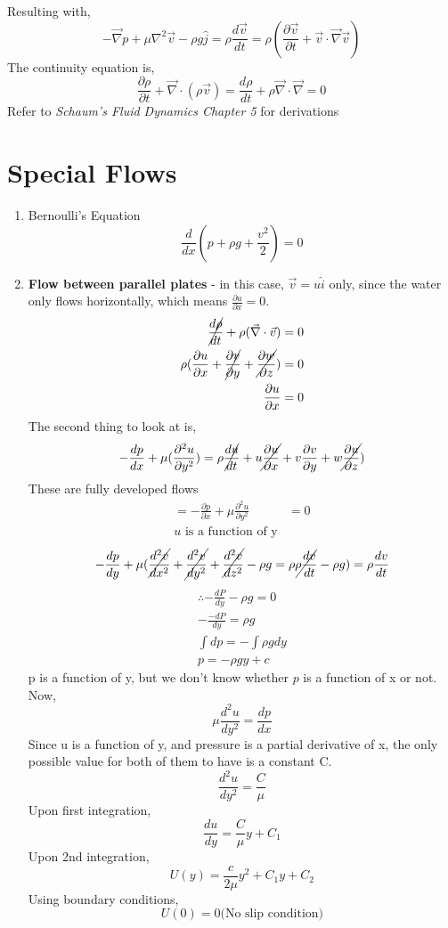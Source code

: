 \documentclass{report}
\begin{document}
Resulting with, 
\[
  - \vec{\nabla}p + \mu \nabla^2\vec{v} - \rho g \hat{j} = \rho \frac{d \vec{v}}{dt} = \rho (\frac{\partial \vec{v}}{\partial t} + \vec{v} \cdot \vec{\nabla} \vec{v})
\]
The continuity equation is,
\[
  \frac{\partial \rho}{\partial t} + \vec{\nabla} \cdot (\rho \vec{v}) = \frac{d \rho}{dt} + \rho \vec{\nabla} \cdot \vec{\nabla} = 0
\]
Refer to \textit{Schaum's Fluid Dynamics Chapter 5} for derivations
\section{Special Flows}
\begin{enumerate}
  \item Bernoulli's Equation \[
   \frac{d}{dx}(p + \rho g + \frac{v^2}{2})  = 0
  \]
\item \textbf{Flow between parallel plates} - in this case, $\vec{v} = u \hat{i}$ only, since the water only flows horizontally, which means $\frac{\partial u}{\partial x} = 0$. 
  \begin{align*}
    \cancel{\frac{d \rho}{d t}} + \rho (\vec{\nabla} \cdot \vec{v}) = 0 \\ 
    \rho(\frac{\partial u}{\partial x} + \cancel{\frac{\partial v}{\partial y}} + \cancel{\frac{\partial w}{\partial z}}) = 0 \\
    \frac{\partial u}{\partial x} = 0
  \end{align*}
  The second thing to look at is, 
  \begin{align*}
    -\frac{dp}{dx} + \mu(\frac{\partial^2 u}{\partial y^2}) &= \rho \cancel{\frac{du}{dt}}+ u \cancel{\frac{\partial u}{\partial x}} + v \frac{\partial v}{\partial y} + w \cancel{\frac{\partial u}{\partial z}}) \\
  \end{align*}
  {These are fully developed flows}
  \begin{align*}
    =-\frac{\partial p}{\partial x} + \mu \frac{\partial^2 u}{\partial y^2} &= 0\\
    u \text{ is a function of y}
  \end{align*} 
  \[
    -\frac{d p}{dy} + \mu(\cancel{\frac{d^2v}{dx^2}}+ \cancel{\frac{d^2v}{dy^2}} + \cancel{\frac{d^2v}{dz^2}} - \rho g = \rho \cancel{\rho\frac{dv}{dt}} - \rho g) = \rho \frac{dv}{dt}
  \]
  \begin{align*}
    \therefore -\frac{dP}{dy} - \rho g = 0 \\
    - \frac{-d P}{dy} = \rho g \\
   \int d p = - \int \rho g dy  \\
    p = - \rho g y + c
  \end{align*}
  p is a function of y, but we don't know whether $p$ is a function of x or not. 
  Now, 
  \[
    \mu \frac{d^2 u}{dy^2} = \frac{dp}{dx}
  \]
  Since u is  a function of y, and pressure is a partial derivative of x, the only possible value for both of them to have is a constant C.
  \[
    \frac{d^2 u}{dy^2} = \frac{C}{\mu} 
  \]
  Upon first integration, 
  \[
    \frac{du}{dy} = \frac{C}{\mu} y + C_1 
  \]
  Upon 2nd integration,
  \[
    U(y) = \frac{c}{2\mu} y^2 + C_1 y + C_2
  \]
Using boundary conditions,
\[
  U(0) = 0 \text{(No slip condition)}
\]


\end{enumerate}
\end{document}

